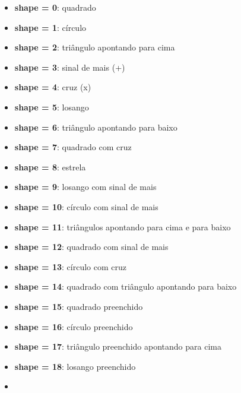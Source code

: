 \documentclass[
  letterpaper,
  DIV=11,
  numbers=noendperiod]{scrreprt}
\providecommand{\tightlist}{%
  \setlength{\itemsep}{0pt}\setlength{\parskip}{0pt}}
\begin{document}
\begin{tcolorbox}[enhanced jigsaw, colframe=quarto-callout-note-color-frame, opacityback=0, breakable, leftrule=.75mm, toprule=.15mm, arc=.35mm, rightrule=.15mm, bottomrule=.15mm, left=2mm, colback=white]
\begin{minipage}[t]{\textwidth - 5.5mm}
\begin{itemize}
\tightlist
\item
  \textbf{shape = 0}: quadrado\\
\item
  \textbf{shape = 1}: círculo\\
\item
  \textbf{shape = 2}: triângulo apontando para cima\\
\item
  \textbf{shape = 3}: sinal de mais (+)\\
\item
  \textbf{shape = 4}: cruz (x)\\
\item
  \textbf{shape = 5}: losango\\
\item
  \textbf{shape = 6}: triângulo apontando para baixo\\
\item
  \textbf{shape = 7}: quadrado com cruz\\
\item
  \textbf{shape = 8}: estrela\\
\item
  \textbf{shape = 9}: losango com sinal de mais\\
\item
  \textbf{shape = 10}: círculo com sinal de mais\\
\item
  \textbf{shape = 11}: triângulos apontando para cima e para baixo\\
\item
  \textbf{shape = 12}: quadrado com sinal de mais\\
\item
  \textbf{shape = 13}: círculo com cruz\\
\item
  \textbf{shape = 14}: quadrado com triângulo apontando para baixo\\
\item
  \textbf{shape = 15}: quadrado preenchido\\
\item
  \textbf{shape = 16}: círculo preenchido\\
\item
  \textbf{shape = 17}: triângulo preenchido apontando para cima\\
\item
  \textbf{shape = 18}: losango preenchido\\
\item

\end{itemize}
\end{minipage}
\end{tcolorbox}
\end{document}
